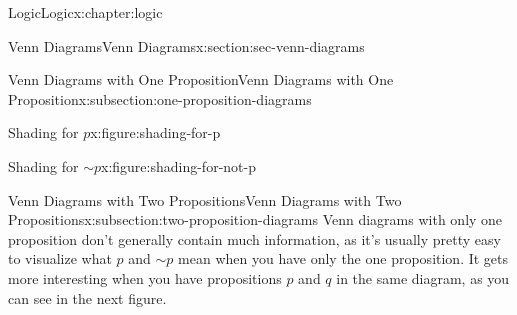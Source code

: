 \documentclass[twoside,10pt,]{book}
\numberwithin{equation}{section}
\begin{document}
\begin{chapterptx}{Logic}{}{Logic}{}{}{x:chapter:logic}
\begin{sectionptx}{Venn Diagrams}{}{Venn Diagrams}{}{}{x:section:sec-venn-diagrams}
\begin{subsectionptx}{Venn Diagrams with One Proposition}{}{Venn Diagrams with One Proposition}{}{}{x:subsection:one-proposition-diagrams}
\begin{sidebyside}{2}{0.05}{0.05}{0.1}%
\begin{sbspanel}{0.4}%
\begin{figureptx}{Shading for \(p\)}{x:figure:shading-for-p}{}%
%
\tcblower
\end{figureptx}%
\end{sbspanel}%
\begin{sbspanel}{0.4}%
\begin{figureptx}{Shading for \(\sim\!{p}\)}{x:figure:shading-for-not-p}{}%
%
\tcblower
\end{figureptx}%
\end{sbspanel}%
\end{sidebyside}%
%
\end{subsectionptx}
%
%
\typeout{************************************************}
\typeout{************************************************}
%
\begin{subsectionptx}{Venn Diagrams with Two Propositions}{}{Venn Diagrams with Two Propositions}{}{}{x:subsection:two-proposition-diagrams}
Venn diagrams with only one proposition don't generally contain much information, as it's usually pretty easy to visualize what \(p\) and \(\sim\!{p}\) mean when you have only the one proposition.  It gets more interesting when you have propositions \(p\) and \(q\) in the same diagram, as you can see in the next figure.%
\par
\begin{image}{0.3}{0.4}{0.3}%
\resizebox{\linewidth}{!}{%
\begin{venndiagram2sets}[labelA={$p$},labelB={$q$}]
\end{venndiagram2sets}
}%
\end{image}%
%
\par

\end{subsectionptx}
\end{sectionptx}
\end{chapterptx}
\end{document}
